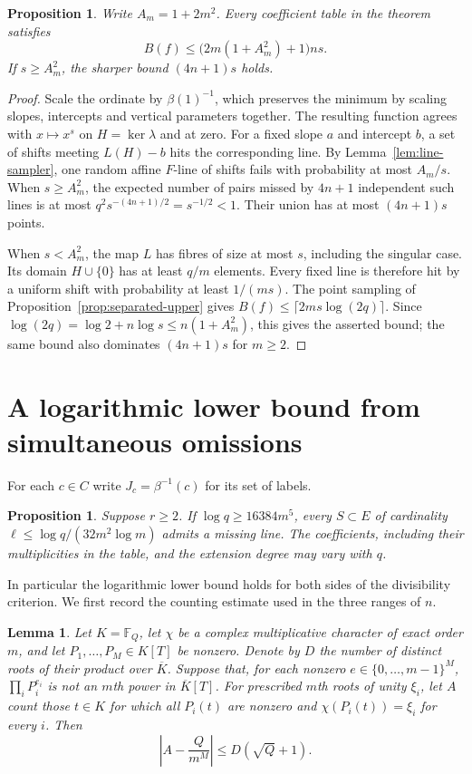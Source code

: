 \documentclass[preprint,12pt,numbers]{elsarticle}
\newtheorem{lemma}[theorem]{Lemma}
\newtheorem{proposition}[theorem]{Proposition}
\begin{document}
\begin{proposition}\label{prop:uniform-upper}
Write $A_m=1+2m^2$. Every coefficient table in the theorem satisfies
\[
 B(f)\le \bigl(2m(1+A_m^2)+1\bigr)ns .
\]
If $s\ge A_m^2$, the sharper bound $(4n+1)s$ holds.
\end{proposition}
\begin{proof}
Scale the ordinate by $\beta(1)^{-1}$, which preserves the minimum by
scaling slopes, intercepts and vertical parameters together. The resulting
function agrees with $x\mapsto x^s$ on $H=\ker\lambda$ and at zero.
For a fixed slope $a$ and intercept $b$, a set of shifts meeting
$L(H)-b$ hits the corresponding line. By Lemma~\ref{lem:line-sampler},
one random affine $F$-line of shifts fails with probability at most
$A_m/s$. When $s\ge A_m^2$, the expected number of pairs missed by
$4n+1$ independent such lines is at most
$q^2s^{-(4n+1)/2}=s^{-1/2}<1$. Their union has at most $(4n+1)s$ points.

When $s<A_m^2$, the map $L$ has fibres of size at most $s$, including
the singular case. Its domain $H\cup\{0\}$ has at least $q/m$ elements.
Every fixed line is therefore hit by a uniform shift with probability at
least $1/(ms)$. The point sampling of Proposition~\ref{prop:separated-upper}
gives $B(f)\le\lceil 2ms\log(2q)\rceil$. Since
$\log(2q)=\log 2+n\log s\le n(1+A_m^2)$, this gives the asserted
bound; the same bound also dominates $(4n+1)s$ for $m\ge2$.
\end{proof}

\section{A logarithmic lower bound from simultaneous omissions}\label{sec:escape}

For each $c\in C$ write $J_c=\beta^{-1}(c)$ for its set of labels.

\begin{proposition}\label{prop:escape}
Suppose $r\ge2$. If $\log q\ge16384m^5$, every $S\subset E$ of
cardinality $\ell\le\log q/(32m^2\log m)$ admits a missing line.
The coefficients, including their multiplicities in the table, and the
extension degree may vary with $q$.
\end{proposition}

In particular the logarithmic lower bound holds for both sides of the
divisibility criterion. We first record the counting estimate used in
the three ranges of $n$.

\begin{lemma}\label{lem:pattern}
Let $K=\mathbb F_Q$, let $\chi$ be a complex multiplicative character of
exact order $m$, and let $P_1,\ldots,P_M\in K[T]$ be nonzero. Denote by
$D$ the number of distinct roots of their product over $\overline K$.
Suppose that, for each nonzero $e\in\{0,\ldots,m-1\}^M$,
$\prod_iP_i^{e_i}$ is not an $m$th power in $\overline K[T]$.
For prescribed $m$th roots of unity $\xi_i$, let $A$ count those $t\in K$
for which all $P_i(t)$ are nonzero and $\chi(P_i(t))=\xi_i$ for every $i$.
Then
\[
 \left|A-\frac{Q}{m^M}\right|\le D(\sqrt Q+1).
\]
\end{lemma}
\end{document}
